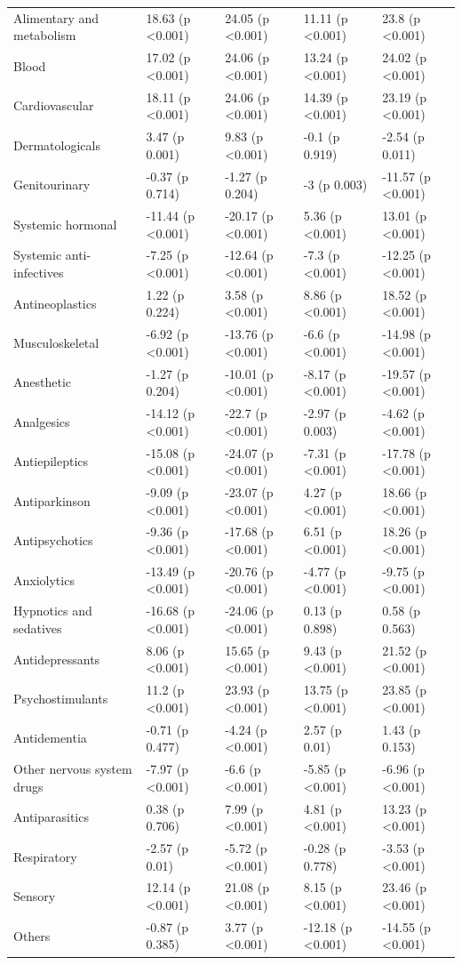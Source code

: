 \documentclass[
  letterpaper,
  DIV=11,
  numbers=noendperiod]{scrartcl}
\begin{document}
\begin{longtable}{lllll}
\endfoot
\bottomrule
\endlastfoot
Alimentary and metabolism & 18.63 (p <0.001) & 24.05 (p <0.001) & 11.11 (p <0.001) & 23.8 (p <0.001)\\
Blood & 17.02 (p <0.001) & 24.06 (p <0.001) & 13.24 (p <0.001) & 24.02 (p <0.001)\\
Cardiovascular & 18.11 (p <0.001) & 24.06 (p <0.001) & 14.39 (p <0.001) & 23.19 (p <0.001)\\
Dermatologicals & 3.47 (p 0.001) & 9.83 (p <0.001) & -0.1 (p 0.919) & -2.54 (p 0.011)\\
Genitourinary & -0.37 (p 0.714) & -1.27 (p 0.204) & -3 (p 0.003) & -11.57 (p <0.001)\\
\addlinespace
Systemic hormonal & -11.44 (p <0.001) & -20.17 (p <0.001) & 5.36 (p <0.001) & 13.01 (p <0.001)\\
Systemic anti-infectives & -7.25 (p <0.001) & -12.64 (p <0.001) & -7.3 (p <0.001) & -12.25 (p <0.001)\\
Antineoplastics & 1.22 (p 0.224) & 3.58 (p <0.001) & 8.86 (p <0.001) & 18.52 (p <0.001)\\
Musculoskeletal & -6.92 (p <0.001) & -13.76 (p <0.001) & -6.6 (p <0.001) & -14.98 (p <0.001)\\
Anesthetic & -1.27 (p 0.204) & -10.01 (p <0.001) & -8.17 (p <0.001) & -19.57 (p <0.001)\\
\addlinespace
Analgesics & -14.12 (p <0.001) & -22.7 (p <0.001) & -2.97 (p 0.003) & -4.62 (p <0.001)\\
Antiepileptics & -15.08 (p <0.001) & -24.07 (p <0.001) & -7.31 (p <0.001) & -17.78 (p <0.001)\\
Antiparkinson & -9.09 (p <0.001) & -23.07 (p <0.001) & 4.27 (p <0.001) & 18.66 (p <0.001)\\
Antipsychotics & -9.36 (p <0.001) & -17.68 (p <0.001) & 6.51 (p <0.001) & 18.26 (p <0.001)\\
Anxiolytics & -13.49 (p <0.001) & -20.76 (p <0.001) & -4.77 (p <0.001) & -9.75 (p <0.001)\\
\addlinespace
Hypnotics and sedatives & -16.68 (p <0.001) & -24.06 (p <0.001) & 0.13 (p 0.898) & 0.58 (p 0.563)\\
Antidepressants & 8.06 (p <0.001) & 15.65 (p <0.001) & 9.43 (p <0.001) & 21.52 (p <0.001)\\
Psychostimulants & 11.2 (p <0.001) & 23.93 (p <0.001) & 13.75 (p <0.001) & 23.85 (p <0.001)\\
Antidementia & -0.71 (p 0.477) & -4.24 (p <0.001) & 2.57 (p 0.01) & 1.43 (p 0.153)\\
Other nervous system drugs & -7.97 (p <0.001) & -6.6 (p <0.001) & -5.85 (p <0.001) & -6.96 (p <0.001)\\
\addlinespace
Antiparasitics & 0.38 (p 0.706) & 7.99 (p <0.001) & 4.81 (p <0.001) & 13.23 (p <0.001)\\
Respiratory & -2.57 (p 0.01) & -5.72 (p <0.001) & -0.28 (p 0.778) & -3.53 (p <0.001)\\
Sensory & 12.14 (p <0.001) & 21.08 (p <0.001) & 8.15 (p <0.001) & 23.46 (p <0.001)\\
Others & -0.87 (p 0.385) & 3.77 (p <0.001) & -12.18 (p <0.001) & -14.55 (p <0.001)\\*


\end{longtable}
\end{document}
